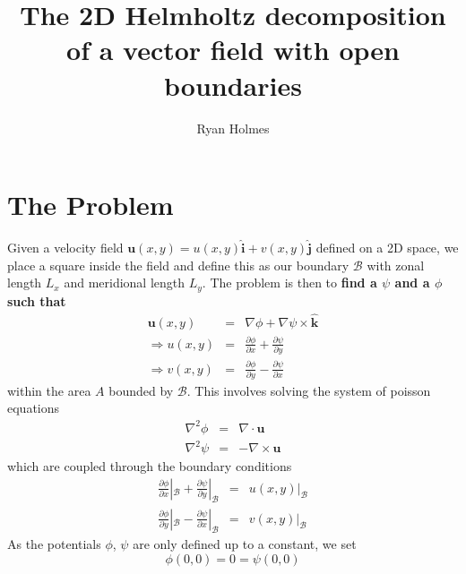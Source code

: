 \documentclass{article}
\title{The 2D Helmholtz decomposition of a vector field with open boundaries}
\author{Ryan Holmes} \geometry{a4paper}
\begin{document}
\maketitle
\section{The Problem}

Given a velocity field $\bm{u}(x,y) = u(x,y)\bm{\hat{i}} +
v(x,y)\bm{\hat{j}}$ defined on a 2D space, we place a square inside
the field and define this as our boundary $\mathcal{B}$ with zonal
length $L_x$ and meridional length $L_y$. The problem is then to
\textbf{find a $\psi$ and a $\phi$ such that}
\begin{eqnarray}
  \bm{u}(x,y) & = & \nabla\phi + \nabla\psi \times \bm{\hat{k}} \nonumber \\
  \Longrightarrow u(x,y) & = & \frac{\partial\phi}{\partial x} + \frac{\partial\psi}{\partial y} \nonumber \\
  \Longrightarrow v(x,y) & = & \frac{\partial\phi}{\partial y} - \frac{\partial\psi}{\partial x} \nonumber
\end{eqnarray}
within the area $A$ bounded by $\mathcal{B}$. This involves solving
the system of poisson equations
\begin{eqnarray}
\label{Pphi}  \nabla^2\phi & = & \nabla\cdot\bm{u} \\
\label{Ppsi}  \nabla^2\psi & = & -\nabla \times \bm{u} 
\end{eqnarray}
which are coupled through the boundary conditions
\begin{eqnarray}
  \frac{\partial\phi}{\partial x}|_{\mathcal{B}} +
  \frac{\partial\psi}{\partial y}|_{\mathcal{B}} & = & u(x,y)|_{\mathcal{B}}\label{BC1} \\
  \frac{\partial\phi}{\partial y}|_{\mathcal{B}} -
  \frac{\partial\psi}{\partial x}|_{\mathcal{B}} & = & v(x,y)|_{\mathcal{B}}\label{BC2}
\end{eqnarray}
As the potentials $\phi$, $\psi$ are only defined up to a constant, we
set 
\begin{equation} \phi(0,0) = 0 = \psi(0,0) \end{equation}
\end{document}
